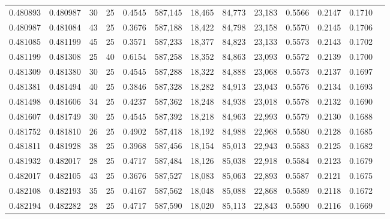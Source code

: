 \begin{tabular}{rrrrrrrrrrrrr}
0.480893 & 0.480987 &    30 &  25 &                                     0.4545 & 587,145 &  18,465 &  84,773 &  23,183 & 0.5566 & 0.2147 & 0.1710 \\
0.480987 & 0.481084 &    43 &  25 &                                     0.3676 & 587,188 &  18,422 &  84,798 &  23,158 & 0.5570 & 0.2145 & 0.1706 \\
0.481085 & 0.481199 &    45 &  25 &                                     0.3571 & 587,233 &  18,377 &  84,823 &  23,133 & 0.5573 & 0.2143 & 0.1702 \\
0.481199 & 0.481308 &    25 &  40 &                                     0.6154 & 587,258 &  18,352 &  84,863 &  23,093 & 0.5572 & 0.2139 & 0.1700 \\
0.481309 & 0.481380 &    30 &  25 &                                     0.4545 & 587,288 &  18,322 &  84,888 &  23,068 & 0.5573 & 0.2137 & 0.1697 \\
0.481381 & 0.481494 &    40 &  25 &                                     0.3846 & 587,328 &  18,282 &  84,913 &  23,043 & 0.5576 & 0.2134 & 0.1693 \\
0.481498 & 0.481606 &    34 &  25 &                                     0.4237 & 587,362 &  18,248 &  84,938 &  23,018 & 0.5578 & 0.2132 & 0.1690 \\
0.481607 & 0.481749 &    30 &  25 &                                     0.4545 & 587,392 &  18,218 &  84,963 &  22,993 & 0.5579 & 0.2130 & 0.1688 \\
0.481752 & 0.481810 &    26 &  25 &                                     0.4902 & 587,418 &  18,192 &  84,988 &  22,968 & 0.5580 & 0.2128 & 0.1685 \\
0.481811 & 0.481928 &    38 &  25 &                                     0.3968 & 587,456 &  18,154 &  85,013 &  22,943 & 0.5583 & 0.2125 & 0.1682 \\
0.481932 & 0.482017 &    28 &  25 &                                     0.4717 & 587,484 &  18,126 &  85,038 &  22,918 & 0.5584 & 0.2123 & 0.1679 \\
0.482017 & 0.482105 &    43 &  25 &                                     0.3676 & 587,527 &  18,083 &  85,063 &  22,893 & 0.5587 & 0.2121 & 0.1675 \\
0.482108 & 0.482193 &    35 &  25 &                                     0.4167 & 587,562 &  18,048 &  85,088 &  22,868 & 0.5589 & 0.2118 & 0.1672 \\
0.482194 & 0.482282 &    28 &  25 &                                     0.4717 & 587,590 &  18,020 &  85,113 &  22,843 & 0.5590 & 0.2116 & 0.1669 \\

\end{tabular}

